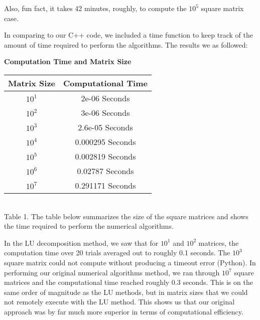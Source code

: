 \documentclass{article}
\begin{document}
Also, fun fact, it takes 42 minutes, roughly, to compute the $10^{5}$ square matrix case.

In comparing to our C++ code, we included a time function to keep track of the amount of time required to perform the algorithms. The results we as followed:


\begin{center}
	\textbf{Computation Time and Matrix Size}\\
	\centering
	\begin{tabular}{|c|c|}
		\hline
		Matrix Size & Computational Time\\
		\hline
		$10^{1}$ &2e-06 Seconds\\
		\hline
		$10^{2}$ &3e-06 Seconds\\
		\hline
		$10^{3}$ & 2.6e-05 Seconds\\
		\hline
		$10^{4}$ & 0.000295 Seconds\\
		\hline
		$10^{5}$ & 0.002819 Seconds\\
		\hline
		$10^{6}$ & 0.02787 Seconds\\
		\hline
		$10^{7}$ & 0.291171 Seconds\\
		\hline
	\end{tabular}
\\ Table 1. The table below summarizes the size of the square matrices and shows the time required to perform the numerical algorithms.

\end{center}

In the LU decomposition method, we saw that for $10^{1}$ and $10^{2}$ matrices, the computation time over 20 trials averaged out to roughly 0.1 seconds. The $10^{3}$ square matrix could not compute without producing a timeout error (Python). In performing our original numerical algorithms method, we ran through $10^{7}$ square matrices and the computational time reached roughly 0.3 seconds. This is on the same order of magnitude as the LU methods, but in matrix sizes that we could not remotely execute with the LU method. This shows us that our original approach was by far much more superior in terms of computational efficiency.
\end{document}
